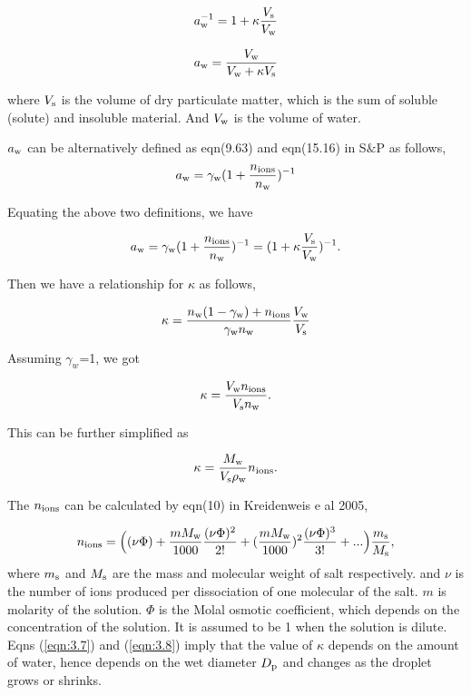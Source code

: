 \documentclass[12pt]{article}
\begin{document}
\begin{equation}\label{eqn:3.1}
a_{\rm w}^{-1}=1+\kappa \frac{V_{\rm s}}{V_{\rm w}}
\end{equation}

\begin{equation}\label{eqn:3.2}
a_{\rm w}=\frac{V_{\rm w}}{V_{\rm w} + \kappa V_{\rm s}}
\end{equation}

where $V_{\rm s}$ is the volume of dry particulate matter, which is the sum of soluble (solute) and insoluble material. And $V_{\rm w}$ is the volume of water.

$a_{\rm w}$ can be alternatively defined as eqn(9.63) and eqn(15.16) in S$\&$P as follows, 
\begin{equation}\label{eqn:3.3}
a_{\rm w}=\gamma_{\rm w}(1+\frac{n_{\rm ions}}{n_{\rm w}})^{-1}
\end{equation}

Equating the above two definitions, we have

\begin{equation}\label{eqn:3.4}
a_{\rm w}=\gamma_{\rm w}(1+\frac{n_{\rm ions}}{n_{\rm w}})^{-1}=(1+\kappa \frac{V_{\rm s}}{V_{\rm w}})^{-1}.
\end{equation}

Then we have a relationship for $\kappa$ as follows,

\begin{equation}\label{eqn:3.5}
\kappa=\frac{n_{\rm w}(1-\gamma_{\rm w})+n_{\rm ions}}{\gamma_{\rm w}n_{\rm w}}\frac{V_{\rm w}}{V_{\rm s}}
\end{equation} 

Assuming $\gamma_{w}$=1, we got 

\begin{equation}\label{eqn:3.6}
\kappa= \frac{V_{\rm w} n_{\rm ions}}{V_{\rm s} n_{\rm w}}.
\end{equation}

This can be further simplified as 

\begin{equation}\label{eqn:3.7}
\kappa= \frac{M_{\rm w}}{V_{\rm s} \rho_{\rm w}}n_{\rm ions}.
\end{equation}

The $n_{\rm ions}$ can be  calculated by eqn(10) in Kreidenweis e al 2005, 

\begin{equation}\label{eqn:3.8}
n_{\rm ions}=\Big((\nu \Phi) + \frac{m M_{\rm w}}{1000} \frac{(\nu \Phi)^{2}}{2!} + (\frac{m M_{\rm w}}{1000})^{2} \frac{(\nu \Phi)^{3}}{3!}+... \Big) \frac{m_{\rm s}}{M_{\rm s}},
\end{equation}
where $m_{\rm s}$ and $M_{\rm s}$ are the mass and molecular weight of salt respectively. and $\nu$ is the number of ions produced per dissociation of one molecular of the salt. $m$ is molarity of the solution. $\Phi$ is the Molal osmotic coefficient, which depends on the concentration of the solution. It is assumed to be 1 when the solution is dilute. Eqns (\ref{eqn:3.7}) and (\ref{eqn:3.8}) imply that the value of $\kappa$ depends on the amount of water, hence depends on the wet diameter $D_{\rm p}$ and changes as the droplet grows or shrinks.
\end{document}
